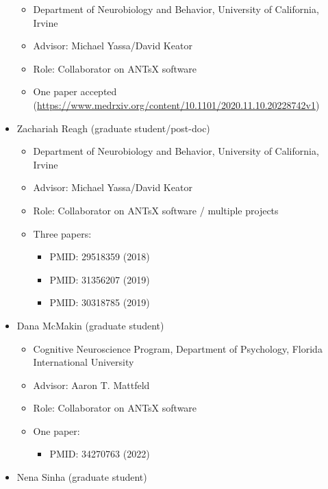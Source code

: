 \documentclass[
  11pt,
]{article}
\providecommand{\tightlist}{%
  \setlength{\itemsep}{0pt}\setlength{\parskip}{0pt}}
\begin{document}
\begin{itemize}
  \begin{itemize}
  \tightlist
  \item
    Department of Neurobiology and Behavior, University of California,
    Irvine
  \item
    Advisor: Michael Yassa/David Keator
  \item
    Role: Collaborator on ANTsX software
  \item
    One paper accepted
    (\url{https://www.medrxiv.org/content/10.1101/2020.11.10.20228742v1})
  \end{itemize}
\item
  Zachariah Reagh (graduate student/post-doc)

  \begin{itemize}
  \tightlist
  \item
    Department of Neurobiology and Behavior, University of California,
    Irvine
  \item
    Advisor: Michael Yassa/David Keator
  \item
    Role: Collaborator on ANTsX software / multiple projects
  \item
    Three papers:

    \begin{itemize}
    \tightlist
    \item
      PMID: 29518359 (2018)
    \item
      PMID: 31356207 (2019)
    \item
      PMID: 30318785 (2019)
    \end{itemize}
  \end{itemize}
\item
  Dana McMakin (graduate student)

  \begin{itemize}
  \tightlist
  \item
    Cognitive Neuroscience Program, Department of Psychology, Florida
    International University
  \item
    Advisor: Aaron T. Mattfeld
  \item
    Role: Collaborator on ANTsX software
  \item
    One paper:

    \begin{itemize}
    \tightlist
    \item
      PMID: 34270763 (2022)
    \end{itemize}
  \end{itemize}
\item
  Nena Sinha (graduate student)


\end{itemize}
\end{document}
